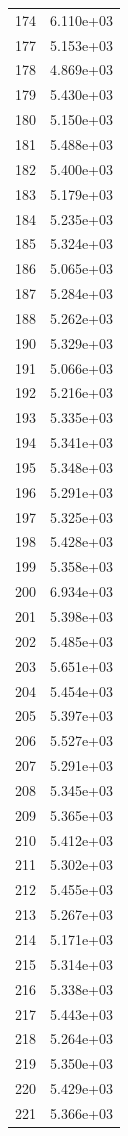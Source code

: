 \documentclass[12pt]{article}
\begin{document}
\begin{longtable}{@{}cc@{}}
174 & 6.110e+03 \\
177 & 5.153e+03 \\
178 & 4.869e+03 \\
179 & 5.430e+03 \\
180 & 5.150e+03 \\
181 & 5.488e+03 \\
182 & 5.400e+03 \\
183 & 5.179e+03 \\
184 & 5.235e+03 \\
185 & 5.324e+03 \\
186 & 5.065e+03 \\
187 & 5.284e+03 \\
188 & 5.262e+03 \\
190 & 5.329e+03 \\
191 & 5.066e+03 \\
192 & 5.216e+03 \\
193 & 5.335e+03 \\
194 & 5.341e+03 \\
195 & 5.348e+03 \\
196 & 5.291e+03 \\
197 & 5.325e+03 \\
198 & 5.428e+03 \\
199 & 5.358e+03 \\
200 & 6.934e+03 \\
201 & 5.398e+03 \\
202 & 5.485e+03 \\
203 & 5.651e+03 \\
204 & 5.454e+03 \\
205 & 5.397e+03 \\
206 & 5.527e+03 \\
207 & 5.291e+03 \\
208 & 5.345e+03 \\
209 & 5.365e+03 \\
210 & 5.412e+03 \\
211 & 5.302e+03 \\
212 & 5.455e+03 \\
213 & 5.267e+03 \\
214 & 5.171e+03 \\
215 & 5.314e+03 \\
216 & 5.338e+03 \\
217 & 5.443e+03 \\
218 & 5.264e+03 \\
219 & 5.350e+03 \\
220 & 5.429e+03 \\
221 & 5.366e+03 \\

\end{longtable}
\end{document}
